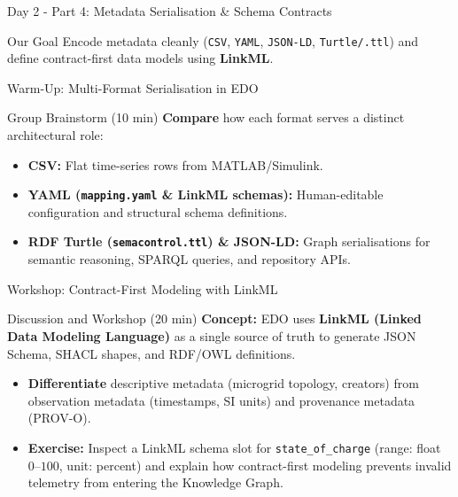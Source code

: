 \documentclass[aspectratio=169]{beamer}
\let\pause\relax
\begin{document}
\begin{frame}{Day 2 - Part 4: Metadata Serialisation \& Schema Contracts}
    \begin{block}{Our Goal}
        Encode metadata cleanly (\texttt{CSV}, \texttt{YAML}, \texttt{JSON-LD}, \texttt{Turtle/.ttl}) and define contract-first data models using \textbf{LinkML}.
    \end{block}
\end{frame}

\begin{frame}{Warm-Up: Multi-Format Serialisation in EDO}
    \begin{block}{Group Brainstorm (10 min)}
        \textbf{Compare} how each format serves a distinct architectural role:
        \begin{itemize}
            \item \textbf{CSV:} Flat time-series rows from MATLAB/Simulink.
            \item \textbf{YAML (\texttt{mapping.yaml} \& LinkML schemas):} Human-editable configuration and structural schema definitions.
            \item \textbf{RDF Turtle (\texttt{semacontrol.ttl}) \& JSON-LD:} Graph serialisations for semantic reasoning, SPARQL queries, and repository APIs.
        \end{itemize}
    \end{block}
\end{frame}

\begin{frame}{Workshop: Contract-First Modeling with LinkML}
    \begin{block}{Discussion and Workshop (20 min)}
        \textbf{Concept:} EDO uses \textbf{LinkML (Linked Data Modeling Language)} as a single source of truth to generate JSON Schema, SHACL shapes, and RDF/OWL definitions.
        \pause
        \begin{itemize}
            \item \textbf{Differentiate} descriptive metadata (microgrid topology, creators) from observation metadata (timestamps, SI units) and provenance metadata (PROV-O).
            \item \textbf{Exercise:} Inspect a LinkML schema slot for \texttt{state\_of\_charge} (range: float $0\text{--}100$, unit: percent) and explain how contract-first modeling prevents invalid telemetry from entering the Knowledge Graph.
        \end{itemize}
    \end{block}
\end{frame}
\end{document}
